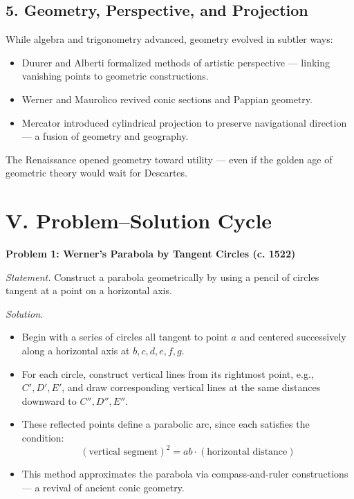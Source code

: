 \documentclass[9pt]{article}
\begin{document}
\subsection*{5. Geometry, Perspective, and Projection}

While algebra and trigonometry advanced, geometry evolved in subtler ways:

\begin{itemize}
    \item Duurer and Alberti formalized methods of artistic perspective — linking vanishing points to geometric constructions.
    \item Werner and Maurolico revived conic sections and Pappian geometry.
    \item Mercator introduced cylindrical projection to preserve navigational direction — a fusion of geometry and geography.
\end{itemize}

The Renaissance opened geometry toward utility — even if the golden age of geometric theory would wait for Descartes.





\newpage



\section*{V. Problem–Solution Cycle}

\textbf{Problem 1: Werner’s Parabola by Tangent Circles (c. 1522)}

\textit{Statement.} Construct a parabola geometrically by using a pencil of circles tangent at a point on a horizontal axis.

\textit{Solution.}
\begin{itemize}
    \item Begin with a series of circles all tangent to point $a$ and centered successively along a horizontal axis at $b, c, d, e, f, g$.
    \item For each circle, construct vertical lines from its rightmost point, e.g., $C', D', E'$, and draw corresponding vertical lines at the same distances downward to $C'', D'', E''$.
    \item These reflected points define a parabolic arc, since each satisfies the condition:
    \[
        (\text{vertical segment})^2 = ab \cdot (\text{horizontal distance})
    \]
    \item This method approximates the parabola via compass-and-ruler constructions — a revival of ancient conic geometry.
\end{itemize}
\end{document}
